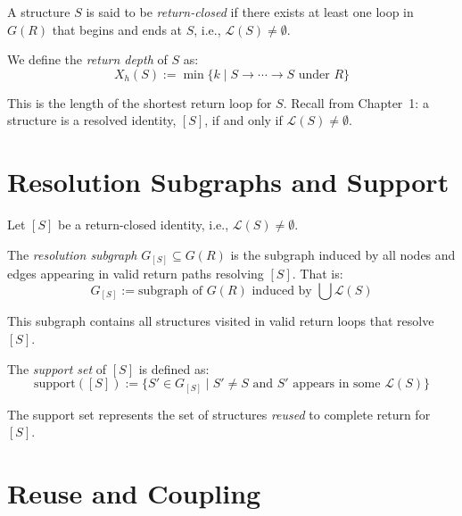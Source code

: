 \begin{definition} \label{def:return-closure}
A structure $S$ is said to be \textit{return-closed} if there exists at least one loop in $G(R)$ that begins and ends at $S$, i.e., $\mathcal{L}(S) \neq \emptyset$.
\end{definition}

We define the \textit{return depth} of $S$ as:
\begin{equation} \label{eq:return-depth}
X_h(S) := \min \{ k \mid S \rightarrow \cdots \rightarrow S \text{ under } R \}
\end{equation}

This is the length of the shortest return loop for $S$.
Recall from Chapter~1: a structure is a resolved identity, $[S]$, if and only if $\mathcal{L}(S) \neq \emptyset$.

\section{Resolution Subgraphs and Support}

Let $[S]$ be a return-closed identity, i.e., $\mathcal{L}(S) \neq \emptyset$.

\begin{definition} \label{def:resolution-subgraph}
The \textit{resolution subgraph} $G_{[S]} \subseteq G(R)$ is the subgraph induced by all nodes and edges appearing in valid return paths resolving $[S]$. That is:
\begin{equation} \label{eq:resolution-subgraph}
G_{[S]} := \text{subgraph of } G(R) \text{ induced by } \bigcup \mathcal{L}(S)
\end{equation}
\end{definition}

This subgraph contains all structures visited in valid return loops that resolve $[S]$.

\begin{definition} \label{def:support-set}
The \textit{support set} of $[S]$ is defined as:
\begin{equation} \label{eq:support-set}
\text{support}([S]) := \{ S' \in G_{[S]} \mid S' \neq S \text{ and } S' \text{ appears in some } \mathcal{L}(S) \}
\end{equation}
\end{definition}

The support set represents the set of structures \textit{reused} to complete return for $[S]$.

\section{Reuse and Coupling}


